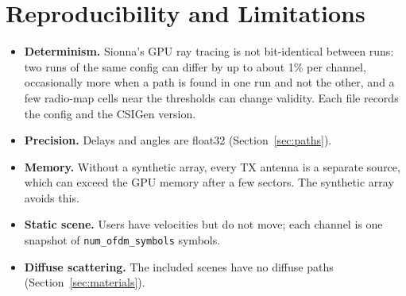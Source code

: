 \documentclass{article}
\newcommand{\key}[1]{\texttt{#1}}
\begin{document}
\clearpage
\section{Reproducibility and Limitations}
\begin{itemize}
  \item \textbf{Determinism.} Sionna's GPU ray tracing is not bit-identical between runs: two runs of the same config can differ by up to about 1\% per channel, occasionally more when a path is found in one run and not the other, and a few radio-map cells near the thresholds can change validity. Each file records the config and the CSIGen version.
  \item \textbf{Precision.} Delays and angles are float32 (Section~\ref{sec:paths}).
  \item \textbf{Memory.} Without a synthetic array, every TX antenna is a separate source, which can exceed the GPU memory after a few sectors. The synthetic array avoids this.
  \item \textbf{Static scene.} Users have velocities but do not move; each channel is one snapshot of \key{num\_ofdm\_symbols} symbols.
  \item \textbf{Diffuse scattering.} The included scenes have no diffuse paths (Section~\ref{sec:materials}).
\end{itemize}
\end{document}

